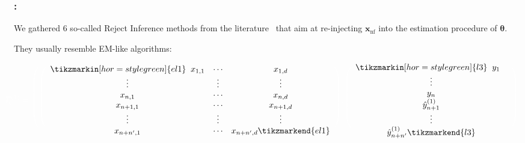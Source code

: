 \documentclass[english,xcolor={rgb,dvipsnames,table,usenames}]{beamer}
\newcommand{\f}{\text{f}}
\newcommand{\nf}{\text{nf}}
\begin{document}
\begin{frame}
\frametitle{\secname : \subsecname}

We gathered 6 so-called Reject Inference methods from the literature~\cite{economix,saporta,RI6,banasik} that aim at re-injecting $\bm{\mathbf{x}}_{\nf}$ into the estimation procedure of $\bm{\theta}$.

\medskip

They usually resemble EM-like algorithms:


\[ \hspace*{-0.8cm}\textcolor{white}{\mathcal{T}_{\text{c}}^{(1)} = {\Huge \Bigg(}}
\textcolor{white}{{\Huge \Bigg(}}
\begin{array}{ccc}
\tikzmarkin[hor=style green]{el1} \; \; x_{1,1} & \cdots & x_{1,d}  \\
 \vdots & \vdots & \vdots \\
 x_{n,1} & \cdots & x_{n,d} \\
 x_{n+1,1} & \cdots & x_{n+1,d}  \\
 \vdots & \vdots & \vdots \\
 x_{n+n',1} & \cdots & x_{n+n',d} \tikzmarkend{el1} \end{array} \textcolor{white}{{\Huge \Bigg)},}
\textcolor{white}{{\Huge \Bigg(}}
\begin{array}{c}
\tikzmarkin[hor=style green]{l3} \; \; y_1 \; \; \; \\
\vdots \\
 y_n \\ 
 \hat{y}_{n+1}^{(1)} \\
\vdots \\
\hat{y}_{n+n'}^{(1)} \tikzmarkend{l3}\end{array} \textcolor{white}{{\Huge \Bigg)},}
\]
\end{frame}
\end{document}
